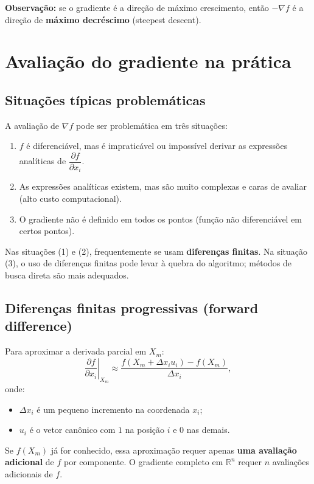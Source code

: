 \documentclass[9pt,a4paper]{extarticle}
\begin{document}
\medskip

\noindent \textbf{Observação:} se o gradiente é a direção de máximo crescimento, então $-\nabla f$ é a direção de \textbf{máximo decréscimo} (steepest descent).

\section{Avaliação do gradiente na prática}

\subsection{Situações típicas problemáticas}

A avaliação de $\nabla f$ pode ser problemática em três situações:

\begin{enumerate}
    \item $f$ é diferenciável, mas é impraticável ou impossível derivar as expressões analíticas de $\dfrac{\partial f}{\partial x_i}$.
    \item As expressões analíticas existem, mas são muito complexas e caras de avaliar (alto custo computacional).
    \item O gradiente não é definido em todos os pontos (função não diferenciável em certos pontos).
\end{enumerate}

\noindent Nas situações (1) e (2), frequentemente se usam \textbf{diferenças finitas}. Na situação (3), o uso de diferenças finitas pode levar à quebra do algoritmo; métodos de busca direta são mais adequados.

\subsection{Diferenças finitas progressivas (forward difference)}

Para aproximar a derivada parcial em $X_m$:
\[
  \left.\frac{\partial f}{\partial x_i}\right|_{X_m}
  \approx
  \frac{ f(X_m + \Delta x_i u_i) - f(X_m) }{\Delta x_i},
\]
onde:
\begin{itemize}
    \item $\Delta x_i$ é um pequeno incremento na coordenada $x_i$;
    \item $u_i$ é o vetor canônico com $1$ na posição $i$ e $0$ nas demais.
\end{itemize}

\noindent Se $f(X_m)$ já for conhecido, essa aproximação requer apenas \textbf{uma avaliação adicional} de $f$ por componente. O gradiente completo em $\mathbb{R}^n$ requer $n$ avaliações adicionais de $f$.
\end{document}
